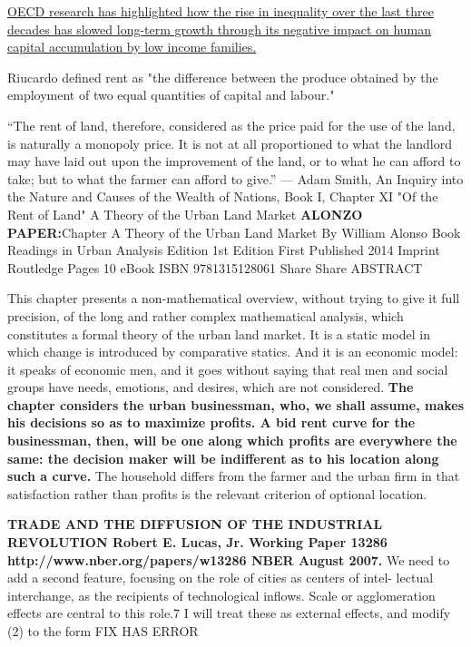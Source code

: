 \href{https://medium.com/@OECD/the-productivity-and-equality-nexus-is-there-a-benefit-in-addressing-them-together-60a46ab4fd09}{
OECD research has highlighted how the rise in inequality over the last three decades has slowed long-term growth through its negative impact on human capital accumulation by low income families.}


Riucardo  defined rent as "the difference between the produce obtained by the employment of two equal quantities of capital and labour."

``The rent of land, therefore, considered as the price paid for the use of the land, is naturally a monopoly price. It is not at all proportioned to what the landlord may have laid out upon the improvement of the land, or to what he can afford to take; but to what the farmer can afford to give.'' — Adam Smith, An Inquiry into the Nature and Causes of the Wealth of Nations, Book I, Chapter XI "Of the Rent of Land" A Theory of the Urban Land Market
\vspace{1cm}
\textbf{ALONZO PAPER:}Chapter
A Theory of the Urban Land Market
By William Alonso
Book
Readings in Urban Analysis
Edition 1st Edition
First Published 2014
Imprint Routledge
Pages 10
eBook ISBN 9781315128061
Share
Share
ABSTRACT

 This chapter presents a non-mathematical overview, without trying to give it full precision, of the long and rather complex mathematical analysis, which constitutes a formal theory of the urban land market. It is a static model in which change is introduced by comparative statics. And it is an economic model: it speaks of economic men, and it goes without saying that real men and social groups have needs, emotions, and desires, which are not considered. \textbf{The chapter considers the urban businessman, who, we shall assume, makes his decisions so as to maximize profits. A bid rent curve for the businessman, then, will be one along which profits are everywhere the same: the decision maker will be indifferent as to his location along such a curve.} The household differs from the farmer and the urban firm in that satisfaction rather than profits is the relevant criterion of optional location.

\vspace{1cm}
\textbf{TRADE AND THE DIFFUSION OF THE INDUSTRIAL REVOLUTION Robert E. Lucas, Jr.
Working Paper 13286 http://www.nber.org/papers/w13286
NBER August 2007.}
We need to add a second feature, focusing on the role of cities as centers of intel- lectual interchange, as the recipients of technological inflows. Scale or agglomeration effects are central to this role.7 I will treat these as external effects, and modify (2) to the form FIX HAS ERROR 

